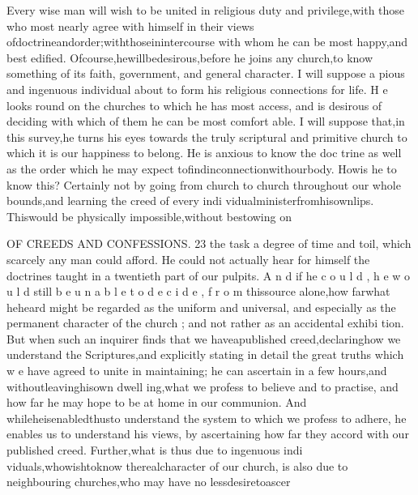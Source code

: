 \documentclass[
]{book}
\begin{document}
Every wise man will wish to be united in
religious duty and privilege,with those who
most nearly agree with himself in their views
ofdoctrineandorder;withthoseinintercourse
with whom he can be most happy,and best
edified. Ofcourse,hewillbedesirous,before
he joins any church,to know something of its
faith, government, and general character. I
will suppose a pious and ingenuous individual
about to form his religious connections for life. H e looks round on the churches to which he
has most access, and is desirous of deciding with which of them he can be most comfort
able. I will suppose that,in this survey,he turns his eyes towards the truly scriptural and
primitive church to which it is our happiness to belong. He is anxious to know the doc
trine as well as the order which he may expect tofindinconnectionwithourbody. Howis he to know this? Certainly not by going
from church to church throughout our whole bounds,and learning the creed of every indi vidualministerfromhisownlips. Thiswould
be physically impossible,without bestowing on

OF CREEDS AND CONFESSIONS. 23
the task a degree of time and toil, which
scarcely any man could afford. He could not
actually hear for himself the doctrines taught
in a twentieth part of our pulpits. A n d if he c o u l d , h e w o u l d still b e u n a b l e t o d e c i d e , f r o m
thissource alone,how farwhat heheard might
be regarded as the uniform and universal, and
especially as the permanent character of the
church ; and not rather as an accidental exhibi
tion. But when such an inquirer finds that
we haveapublished creed,declaringhow we
understand the Scriptures,and explicitly stating
in detail the great truths which w e have agreed
to unite in maintaining; he can ascertain in a
few hours,and withoutleavinghisown dwell
ing,what we profess to believe and to practise,
and how far he may hope to be at home in our communion. And whileheisenabledthusto
understand the system to which we profess to adhere, he enables us to understand his views, by ascertaining how far they accord with our
published creed.
Further,what is thus due to ingenuous indi viduals,whowishtoknow therealcharacter of our church, is also due to neighbouring churches,who may have no lessdesiretoascer
\end{document}
